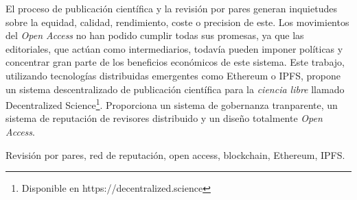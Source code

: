 El proceso de publicación científica y la revisión por pares generan inquietudes
sobre la equidad, calidad, rendimiento, coste o precision de este. Los movimientos del
\emph{Open Access} no han podido cumplir todas sus promesas, ya que las
editoriales, que actúan como 
intermediarios, todavía pueden imponer políticas y concentrar gran parte de los
beneficios económicos de este sistema.
Este trabajo, utilizando tecnologías distribuidas emergentes como Ethereum o
IPFS, propone un sistema descentralizado de publicación científica para la
\emph{ciencia libre} llamado Decentralized Science\footnote{Disponible en
  https://decentralized.science}. Proporciona un sistema de gobernanza
tranparente, un sistema de reputación de revisores distribuido y un diseño
totalmente \emph{Open Access}.

 Revisión por pares, red de reputación, open access,
blockchain, Ethereum, IPFS.
\endinput
